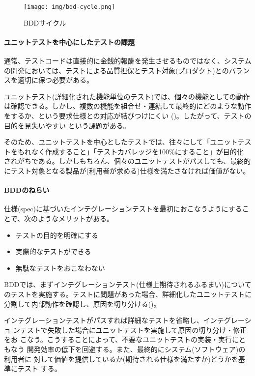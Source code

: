 \begin{wrapfigure}{r}{16zw}
 \vspace*{-\intextsep}
 \texttt{[image: img/bdd-cycle.png]}
 \caption{BDDサイクル\cite{bdd-cycle-figref}}
 \label{fig:bdd-cycle}
\end{wrapfigure}

    \paragraph{ユニットテストを中心にしたテストの課題}
通常、テストコードは直接的に金銭的報酬を発生させるものではなく、システム
の開発においては、テストによる品質担保とテスト対象(プロダクト)とのバラン
スを適切に保つ必要がある。

ユニットテスト(詳細化された機能単位のテスト)では、個々の機能としての動作
は確認できる。しかし、複数の機能を組合せ・連結して最終的にどのような動作
をするか、という要求仕様との対応が結びつけにくい
()。したがって、テストの目的を見失いやすい
という課題がある。

そのため、ユニットテストを中心としたテストでは、往々にして「ユニットテス
トをもれなく作成すること」「テストカバレッジを100\%にすること」が目的化
されがちである。しかしもちろん、個々のユニットテストがパスしても、最終的
にテスト対象となる製品が(利用者が求める)仕様を満たさなければ価値がない。

    \paragraph{BDDのねらい}
仕様(spec)に基づいたインテグレーションテストを最初におこなうようにするこ
とで、次のようなメリットがある。
\begin{itemize}
 \item テストの目的を明確にする
 \item 実際的なテストができる
 \item 無駄なテストをおこなわない
\end{itemize}

BDDでは、まずインテグレーションテスト(仕様上期待されるふるまい)について
のテストを実施する。テストに問題があった場合、詳細化したユニットテストに
分割して内部動作を確認し、原因を切り分ける()。

インテグレーションテストがパスすれば詳細なテストを省略し、インテグレーショ
ンテストで失敗した場合にユニットテストを実施して原因の切り分け・修正をお
こなう。こうすることによって、不要なユニットテストの実装・実行にともなう
開発効率の低下を回避する。また、最終的にシステム(ソフトウェア)の利用者に
対して価値を提供しているか(期待される仕様を満たすか)どうかを基準にテスト
する。

